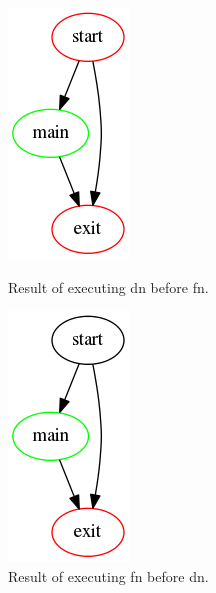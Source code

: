 \documentclass[a4paper]{report}
\begin{document}
\begin{figure}[h!]
\centering
\begin{minipage}{0.45\textwidth}
\centering
\includegraphics[scale=0.5]{images/AOFDot/Order1.png}
\caption{Result of executing dn before fn.}
\label{fig:Dot_Order}
\end{minipage}\hfill
\begin{minipage}{0.45\textwidth}
\centering
\includegraphics[scale=0.5]{images/AOFDot/Order2.png}
\caption{Result of executing fn before dn.}
\label{fig:Dot_Order2}
\end{minipage}
\end{figure}
\end{document}
